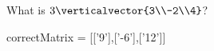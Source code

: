 \documentclass{ximera}
\begin{document}
\begin{question}
  \begin{solution}
    \begin{hint}
      $3\verticalvector{3\\-2\\4} = \verticalvector{3(3)\\3(-2)\\3(4)}  = \verticalvector{9\\6\\12}}$
    \end{hint}
    What is $3\verticalvector{3\\-2\\4}$?
    \begin{matrix-answer}[name=v]
      correctMatrix = [['9'],['-6'],['12']]
    \end{matrix-answer}
  \end{solution}
\end{question}
\end{document}
